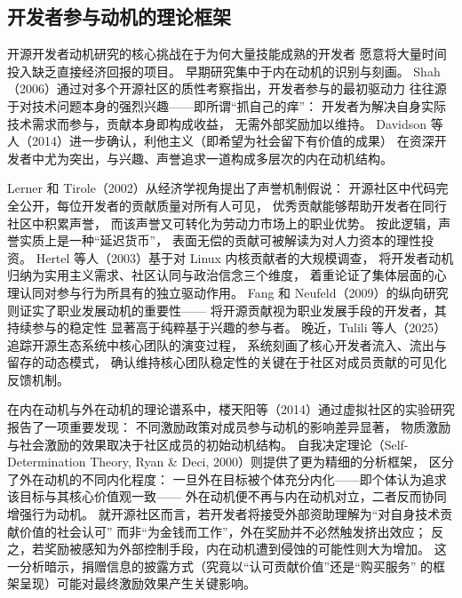 \subsection{开发者参与动机的理论框架}

开源开发者动机研究的核心挑战在于为何大量技能成熟的开发者
愿意将大量时间投入缺乏直接经济回报的项目。
早期研究集中于内在动机的识别与刻画。
Shah（2006）通过对多个开源社区的质性考察指出，开发者参与的最初驱动力
往往源于对技术问题本身的强烈兴趣——即所谓“抓自己的痒”：
开发者为解决自身实际技术需求而参与，贡献本身即构成收益，
无需外部奖励加以维持\cite{shah2006motivation}。
Davidson 等人（2014）进一步确认，利他主义（即希望为社会留下有价值的成果）
在资深开发者中尤为突出，与兴趣、声誉追求一道构成多层次的内在动机结构\cite{davidson2014older}。

Lerner 和 Tirole（2002）从经济学视角提出了声誉机制假说：
开源社区中代码完全公开，每位开发者的贡献质量对所有人可见，
优秀贡献能够帮助开发者在同行社区中积累声誉，
而该声誉又可转化为劳动力市场上的职业优势\cite{lerner2002simple}。
按此逻辑，声誉实质上是一种“延迟货币”，
表面无偿的贡献可被解读为对人力资本的理性投资。
Hertel 等人（2003）基于对 Linux 内核贡献者的大规模调查，
将开发者动机归纳为实用主义需求、社区认同与政治信念三个维度，
着重论证了集体层面的心理认同对参与行为所具有的独立驱动作用\cite{hertel2003motivation}。
Fang 和 Neufeld（2009）的纵向研究则证实了职业发展动机的重要性——
将开源贡献视为职业发展手段的开发者，其持续参与的稳定性
显著高于纯粹基于兴趣的参与者\cite{fang2009understanding}。
晚近，Tulili 等人（2025）追踪开源生态系统中核心团队的演变过程，
系统刻画了核心开发者流入、流出与留存的动态模式，
确认维持核心团队稳定性的关键在于社区对成员贡献的可见化反馈机制\cite{tulili2025exploring}。

在内在动机与外在动机的理论谱系中，楼天阳等（2014）通过虚拟社区的实验研究报告了一项重要发现：
不同激励政策对成员参与动机的影响差异显著，
物质激励与社会激励的效果取决于社区成员的初始动机结构\cite{lou2014incentive}。
自我决定理论（Self-Determination Theory, Ryan \& Deci, 2000）\cite{ryan2000self}则提供了更为精细的分析框架，
区分了外在动机的不同内化程度：
一旦外在目标被个体充分内化——即个体认为追求该目标与其核心价值观一致——
外在动机便不再与内在动机对立，二者反而协同增强行为动机。
就开源社区而言，若开发者将接受外部资助理解为“对自身技术贡献价值的社会认可”
而非“为金钱而工作”，外在奖励并不必然触发挤出效应；
反之，若奖励被感知为外部控制手段，内在动机遭到侵蚀的可能性则大为增加。
这一分析暗示，捐赠信息的披露方式（究竟以“认可贡献价值”还是“购买服务”
的框架呈现）可能对最终激励效果产生关键影响\cite{benabou2003intrinsic}。

